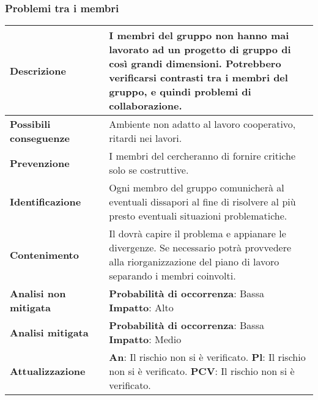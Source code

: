 	
	\newpage
	\subsubsection {Problemi tra i membri}
	\label{subsec:pbmTraMembri}
	
	\small
	\begin{table}[H]
		\begin{center}			
			\begin{tabular}{p{2.5cm}p{0.5cm}p{11cm}}
				\arrayrulecolor{lightgray}
				
				\toprule				
				\textbf{Descrizione}
				& &
				I membri del gruppo non hanno mai lavorato ad un progetto di gruppo di così grandi dimensioni. Potrebbero verificarsi contrasti tra i membri del gruppo, e quindi problemi di collaborazione.
				\\
				\midrule
				\textbf{Possibili \newline conseguenze}
				& &
				Ambiente non adatto al lavoro cooperativo, ritardi nei lavori.
				\\
				\midrule
				\textbf{Prevenzione}
				& &
				I membri del \glo{Gruppo}{team} cercheranno di fornire critiche solo se costruttive.
				\\
				\midrule
				\textbf{Identificazione}
				& &
				Ogni membro del gruppo comunicherà al \responsabilediprogetto{} eventuali dissapori al fine di risolvere al più presto eventuali situazioni problematiche.
				\\
				\midrule
				\textbf{Contenimento}
				& &
				Il \responsabilediprogetto{} dovrà capire il problema e appianare le divergenze. Se necessario potrà provvedere alla riorganizzazione del piano di lavoro separando i membri coinvolti.
				\\
				\midrule
				\textbf{Analisi \newline non mitigata}
				& &
				\textbf{Probabilità di occorrenza}: Bassa
				\newline
				\textbf{Impatto}: Alto
				\\
				\midrule
				\textbf{Analisi \newline mitigata}
				& &
				\textbf{Probabilità di occorrenza}: Bassa
				\newline
				\textbf{Impatto}: Medio
				\\
				\midrule
				\textbf{Attualizzazione}
				& &
				\textbf{An}: Il rischio non si è verificato.
				\newline
				\textbf{Pl}: Il rischio non si è verificato.
				\newline
				\textbf{PCV}: Il rischio non si è verificato.
				\\
				
				\bottomrule	
			\end{tabular}
		\end{center}
	\end{table}			
	
